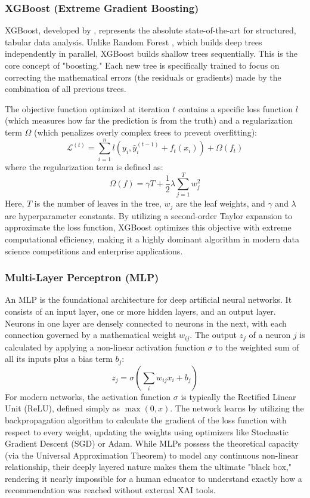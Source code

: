 \subsubsection{XGBoost (Extreme Gradient Boosting)}
XGBoost, developed by \textcite{chen2016xgboost}, represents the absolute state-of-the-art for structured, tabular data analysis. Unlike Random Forest \parencite{breiman2001random}, which builds deep trees independently in parallel, XGBoost \parencite{chen2016xgboost} builds shallow trees sequentially. This is the core concept of "boosting." Each new tree is specifically trained to focus on correcting the mathematical errors (the residuals or gradients) made by the combination of all previous trees. 

The objective function optimized at iteration $t$ contains a specific loss function $l$ (which measures how far the prediction is from the truth) and a regularization term $\Omega$ (which penalizes overly complex trees to prevent overfitting):
\[
\mathcal{L}^{(t)} = \sum_{i=1}^{n} l\left(y_i, \hat{y}_i^{(t-1)} + f_t(x_i)\right) + \Omega(f_t)
\]
where the regularization term is defined as:
\[
\Omega(f) = \gamma T + \frac{1}{2} \lambda \sum_{j=1}^{T} w_j^2
\]
Here, $T$ is the number of leaves in the tree, $w_j$ are the leaf weights, and $\gamma$ and $\lambda$ are hyperparameter constants. By utilizing a second-order Taylor expansion to approximate the loss function, XGBoost \parencite{chen2016xgboost} optimizes this objective with extreme computational efficiency, making it a highly dominant algorithm in modern data science competitions and enterprise applications.

\subsubsection{Multi-Layer Perceptron (MLP)}
An MLP is the foundational architecture for deep artificial neural networks. It consists of an input layer, one or more hidden layers, and an output layer. Neurons in one layer are densely connected to neurons in the next, with each connection governed by a mathematical weight $w_{ij}$. The output $z_j$ of a neuron $j$ is calculated by applying a non-linear activation function $\sigma$ to the weighted sum of all its inputs plus a bias term $b_j$:
\[
z_j = \sigma \left( \sum_{i} w_{ij} x_i + b_j \right)
\]
For modern networks, the activation function $\sigma$ is typically the Rectified Linear Unit (ReLU), defined simply as $\max(0, x)$. The network learns by utilizing the backpropagation algorithm to calculate the gradient of the loss function with respect to every weight, updating the weights using optimizers like Stochastic Gradient Descent (SGD) or Adam. While MLPs possess the theoretical capacity (via the Universal Approximation Theorem) to model any continuous non-linear relationship, their deeply layered nature makes them the ultimate "black box," rendering it nearly impossible for a human educator to understand exactly how a recommendation was reached without external XAI tools.

